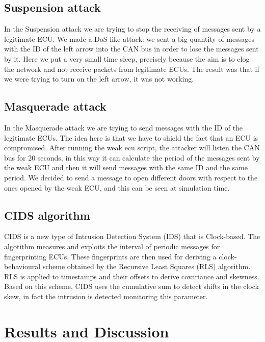 \documentclass[12pt]{article}
\begin{document}
\subsection{Suspension attack}
In the Suspension attack we are trying to stop the receiving of messages sent by a legitimate ECU. We made a DoS like attack: we sent a big quantity of messages with the ID of the left arrow into the CAN bus in order to lose the messages sent by it. Here we put a very small time sleep, precisely because the aim is to clog the network and not receive packets from legitimate ECUs. The result was that if we were trying to turn on the left arrow, it was not working.
\subsection{Masquerade attack}
In the Masquerade attack we are trying to send messages with the ID of the legitimate ECUs. The idea here is that we have to shield the fact that an ECU is compromised. After running the weak ecu script, the attacker will listen the CAN bus for 20 seconds, in this way it can calculate the period of the messages sent by the weak ECU and then it will send messages with the same ID and the same period. We decided to send a message to open different doors with respect to the ones opened by the weak ECU, and this can be seen at simulation time.
\subsection{CIDS algorithm}
CIDS is a new type of Intrusion Detection System (IDS) that is Clock-based. The algotithm measures and exploits the interval of periodic messages for fingerprinting ECUs. These fingerprints are then used for deriving a clock-behavioural scheme obtained by the Recursive Least Squares (RLS) algorithm. RLS is applied to timestamps and their offsets to derive covariance and skewness. Based on this scheme, CIDS uses the cumulative sum to detect shifts in the clock skew, in fact the intrusion is detected monitoring this parameter.
\section{Results and Discussion}
\printbibliography 
\end{document}
